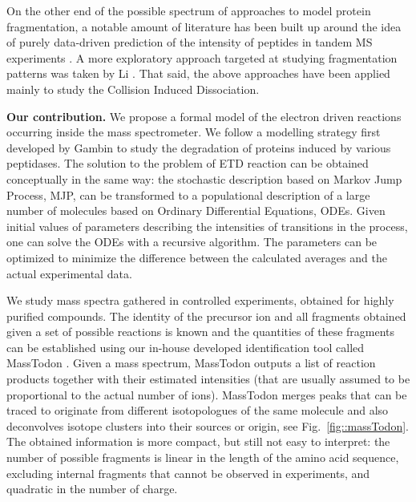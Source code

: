\documentclass{llncs}
\begin{document}
On the other end of the possible spectrum of approaches to model protein fragmentation, a notable amount of literature has been built up around the idea of purely data-driven prediction of the intensity of peptides in tandem MS experiments \cite{Elias2004-fr,Arnold2006-wn,Degroeve2013-ej} . A more exploratory approach targeted at studying fragmentation patterns was taken by Li \cite{Li2011-mq}. That said, the above approaches have been applied mainly to study the Collision Induced Dissociation.

\textbf{Our contribution.}
We propose a formal model of the electron driven reactions occurring inside the mass spectrometer. We follow a modelling strategy first developed by Gambin \cite{Gambin2010} to study the degradation of proteins induced by various peptidases.
The solution to the problem of ETD reaction can be obtained conceptually in the same way: the stochastic description based on Markov Jump Process, MJP, can be transformed to a populational description of a large number of molecules based on Ordinary Differential Equations, ODEs.
Given initial values of parameters describing the intensities of transitions in the process, one can solve the ODEs with a recursive algorithm. The parameters can be optimized to minimize the difference between the calculated averages and the actual experimental data.

We study mass spectra gathered in controlled experiments, obtained for highly purified compounds. The identity of the precursor ion and all fragments obtained given a set of possible reactions is known and the quantities of these fragments can be established using our in-house developed identification tool called {\sc MassTodon} \cite{Lermyte2015-lm,Lermyte2017-zt}. Given a mass spectrum, {\sc MassTodon} outputs a list of reaction products together with their estimated intensities (that are usually assumed to be proportional to the actual number of ions). {\sc MassTodon} merges peaks that can be traced to originate from different isotopologues of the same molecule and also deconvolves isotope clusters into their sources or origin, see Fig.~\ref{fig::massTodon}.
The obtained information is more compact, but still not easy to interpret: the number of possible fragments is linear in the length of the amino acid sequence, excluding internal fragments that cannot be observed in experiments, and quadratic in the number of charge.
\end{document}
